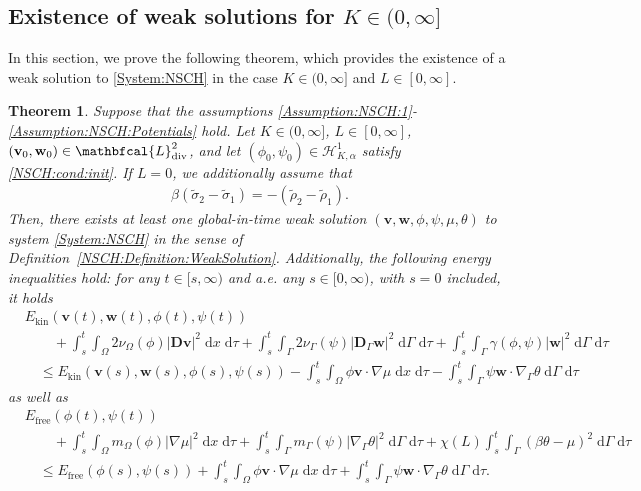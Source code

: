 \documentclass[11pt,reqno]{amsart}
\newtheorem{theorem}{Theorem}[section]
\theoremstyle{remark}
\numberwithin{equation}{section}
\newcommand{\abs}[1]{|#1|}
\newcommand{\intO}{\int_\Omega}
\newcommand{\intG}{\int_\Gamma}
\newcommand{\dxtau}{\;\mathrm{d}x\;\mathrm{d}\tau}
\newcommand{\dGtau}{\;\mathrm{d}\Ga\;\mathrm{d}\tau}
\newcommand{\Grad}{\nabla}
\newcommand{\Div}{\textnormal{div}}
\newcommand{\Gradg}{\nabla_\Ga}
\newcommand{\Om}{\Omega}
\newcommand{\Ga}{\Gamma}
\newcommand{\bv}{\mathbf v}
\newcommand{\bw}{\mathbf w}
\newcommand{\D}{\mathbf D}
\newcommand{\Dg}{\mathbf D_\Ga}
\newcommand{\free}{\mathrm{free}}
\begin{document}
\subsection{Existence of weak solutions for \texorpdfstring{$K\in(0,\infty]$}{K>0}}

In this section, we prove the following theorem, which provides the existence of a weak solution to \eqref{System:NSCH} in the case $K\in(0,\infty]$ and $L\in[0,\infty]$.


\begin{theorem}\label{NSCH:Theorem:ExistenceWeakSolutions:K>0}
Suppose that the assumptions \ref{Assumption:NSCH:1}-\ref{Assumption:NSCH:Potentials} hold.
Let $K\in(0,\infty]$, $L\in[0,\infty]$, $(\bv_0,\bw_0)\in\mathbfcal{L}^2_\Div$, and let $(\phi_0,\psi_0)\in\mathcal{H}^1_{K,\alpha}$ satisfy \eqref{NSCH:cond:init}. If $L = 0$, we additionally assume that
    \begin{align}\label{Dens:Cond}
    	\beta(\tilde\sigma_2 - \tilde\sigma_1) = -(\tilde\rho_2 - \tilde\rho_1).
    \end{align}
    Then, there exists at least one global-in-time weak solution $(\bv,\bw,\phi,\psi,\mu,\theta)$ to system \eqref{System:NSCH} in the sense of Definition~\ref{NSCH:Definition:WeakSolution}. Additionally, the following energy inequalities hold: for any $t\in[s,\infty)$ and a.e. any $s\in[0,\infty)$, with $s = 0$ included, it holds
    \begin{align}
        &E_\mathrm{kin}(\bv(t),\bw(t),\phi(t),\psi(t)) \nonumber \\
        &\qquad + \int_s^t\intO 2\nu_\Om(\phi)\abs{\D\bv}^2\dxtau + \int_s^t\intG 2\nu_\Ga(\psi)\abs{\Dg\bw}^2\dGtau + \int_s^t\intG \gamma(\phi,\psi)\abs{\bw}^2\dGtau \nonumber \\
        &\quad\leq E_\mathrm{kin}(\bv(s),\bw(s),\phi(s),\psi(s)) - \int_s^t\intO \phi\bv\cdot\Grad\mu\dxtau - \int_s^t\intG \psi\bw\cdot\Gradg\theta\dGtau \label{EnergyInequality:Kinetic:K>0}
    \end{align}
    as well as
    \begin{align}
        &E_\free(\phi(t),\psi(t)) \nonumber \\
        &\qquad + \int_s^t\intO m_\Om(\phi)\abs{\Grad\mu}^2\dxtau + \int_s^t\intG m_\Ga(\psi)\abs{\Gradg\theta}^2\dGtau + \chi(L)\int_s^t\intG(\beta\theta-\mu)^2\dGtau \nonumber \\
        &\quad\leq E_\free(\phi(s),\psi(s)) + \int_s^t\intO \phi\bv\cdot\Grad\mu\dxtau + \int_s^t\intG \psi\bw\cdot\Gradg\theta\dGtau. \label{EnergyInequality:Free:K>0}
    \end{align}
\end{theorem}
\end{document}
